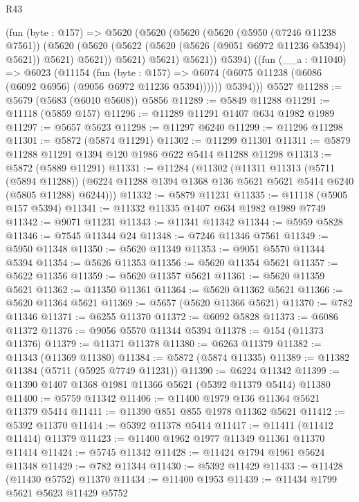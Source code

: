 \begin{lexlean}{R43}
\begin{coremodule}
          (fun (byte : @157) =>
          @5620
            (@5620
              (@5620
                (@5620
                  (@5950 (@7246 @11238 @7561))
                  (@5620
                    (@5620 (@5622 (@5620 (@5626 (@9051 @6972 @11236 @5394)) @5621)) @5621)
                    @5621))
                @5621)
              @5621)
            @5621))
          @5394)
        ((fun (__a : @11040) =>
        @6023
          (@11154
            (fun (byte : @157) =>
            @6074 (@6075 @11238 (@6086 (@6092 @6956) (@9056 @6972 @11236 @5394))))))
          @5394)))
    @5527
@11288 := @5679 (@5683 (@6010 @5608)) @5856
@11289 := @5849 @11288
@11291 := @11118 (@5859 @157)
@11296 := @11289 @11291 @1407 @634 @1982 @1989
@11297 := @5657 @5623
@11298 := @11297 @6240
@11299 := @11296 @11298
@11301 := @5872 (@5874 @11291)
@11302 := @11299 @11301
@11311 := @5879 @11288 @11291 @1394 @120 @1986 @622 @5414 @11288 @11298
@11313 := @5872 (@5889 @11291)
@11331 := @11284
    (@11302
      (@11311
        @11313
        (@5711 (@5894 @11288))
        (@6224 @11288 @1394 @1368 @136 @5621 @5621 @5414 @6240 (@5805 @11288) @6244)))
@11332 := @5879 @11231
@11335 := @11118 (@5905 @157 @5394)
@11341 := @11332 @11335 @1407 @634 @1982 @1989 @7749
@11342 := @9071 @11231
@11343 := @11341 @11342
@11344 := @5959 @5828
@11346 := @7545 @11344 @24
@11348 := @7246 @11346 @7561
@11349 := @5950 @11348
@11350 := @5620 @11349
@11353 := @9051 @5570 @11344 @5394
@11354 := @5626 @11353
@11356 := @5620 @11354 @5621
@11357 := @5622 @11356
@11359 := @5620 @11357 @5621
@11361 := @5620 @11359 @5621
@11362 := @11350 @11361
@11364 := @5620 @11362 @5621
@11366 := @5620 @11364 @5621
@11369 := @5657 (@5620 @11366 @5621)
@11370 := @782 @11346
@11371 := @6255 @11370
@11372 := @6092 @5828
@11373 := @6086 @11372
@11376 := @9056 @5570 @11344 @5394
@11378 := @154 (@11373 @11376)
@11379 := @11371 @11378
@11380 := @6263 @11379
@11382 := @11343 (@11369 @11380)
@11384 := @5872 (@5874 @11335)
@11389 := @11382 @11384 (@5711 (@5925 @7749 @11231))
@11390 := @6224 @11342
@11399 := @11390 @1407 @1368 @1981 @11366 @5621 (@5392 @11379 @5414) @11380
@11400 := @5759 @11342
@11406 := @11400 @1979 @136 @11364 @5621 @11379 @5414
@11411 := @11390 @851 @855 @1978 @11362 @5621
@11412 := @5392 @11370
@11414 := @5392 @11378 @5414
@11417 := @11411 (@11412 @11414) @11379
@11423 := @11400 @1962 @1977 @11349 @11361 @11370 @11414
@11424 := @5745 @11342
@11428 := @11424 @1794 @1961 @5624 @11348
@11429 := @782 @11344
@11430 := @5392 @11429
@11433 := @11428 (@11430 @5752) @11370
@11434 := @11400 @1953
@11439 := @11434 @1799 @5621 @5623 @11429 @5752

\end{coremodule}
\end{lexlean}
